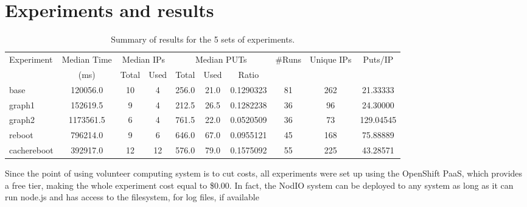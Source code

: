 \documentclass[runningheads,a4paper]{llncs}\usepackage[]{graphicx}\usepackage[]{color}
\begin{document}
\section{Experiments and results} 
\label{sec:experiments}

\begin{table}[htb]
\caption{Summary of results for the 5 sets of experiments.\label{tab:runs}}
\begin{center}
\begin{tabular}{|l|c|c|c|c|c|c|c|c|c|}
\hline
Experiment & Median Time & \multicolumn{2}{|c|}{Median IPs} &
\multicolumn{3}{|c|}{Median PUTs} & \#Runs & Unique IPs & Puts/IP \\
           &   (ms)        & Total & Used & Total & Used & Ratio &  & & \\
\hline
base & 120056.0 & 10 & 4 & 256.0 & 21.0 & 0.1290323 & 81 & 262 & 21.33333\\
\hline
graph1 & 152619.5 & 9 & 4 & 212.5 & 26.5 & 0.1282238 & 36 & 96 & 24.30000\\

graph2 & 1173561.5 & 6 & 4 & 761.5 & 22.0 & 0.0520509 & 36 & 73 & 129.04545\\
\hline
reboot & 796214.0 & 9 & 6 & 646.0 & 67.0 & 0.0955121 & 45 & 168 & 75.88889\\
\hline
cachereboot & 392917.0 & 12 & 12 & 576.0 & 79.0 & 0.1575092 & 55 & 225 & 43.28571\\
\hline
\end{tabular}
\end{center}
\end{table}
%
%
%
Since the point of using volunteer computing system is to cut costs,
all experiments were set up using the OpenShift
PaaS, which provides a free tier, making the whole experiment cost
equal to \$0.00. In fact, the NodIO system can be deployed to any
system as long as it can run node.js and has access to the filesystem, for
log files, if available%
\end{document}
